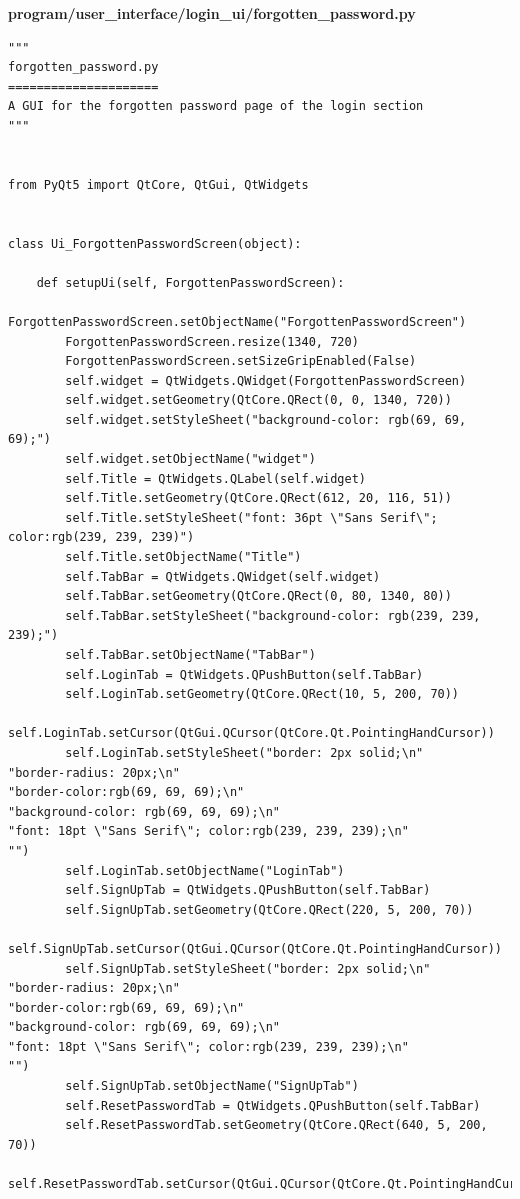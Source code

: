 \documentclass{article}
\begin{document}
\textbf{program/user\_interface/login\_ui/forgotten\_password.py}

\begin{lstlisting}
"""
forgotten_password.py
=====================
A GUI for the forgotten password page of the login section
"""


from PyQt5 import QtCore, QtGui, QtWidgets


class Ui_ForgottenPasswordScreen(object):

    def setupUi(self, ForgottenPasswordScreen):
        ForgottenPasswordScreen.setObjectName("ForgottenPasswordScreen")
        ForgottenPasswordScreen.resize(1340, 720)
        ForgottenPasswordScreen.setSizeGripEnabled(False)
        self.widget = QtWidgets.QWidget(ForgottenPasswordScreen)
        self.widget.setGeometry(QtCore.QRect(0, 0, 1340, 720))
        self.widget.setStyleSheet("background-color: rgb(69, 69, 69);")
        self.widget.setObjectName("widget")
        self.Title = QtWidgets.QLabel(self.widget)
        self.Title.setGeometry(QtCore.QRect(612, 20, 116, 51))
        self.Title.setStyleSheet("font: 36pt \"Sans Serif\"; color:rgb(239, 239, 239)")
        self.Title.setObjectName("Title")
        self.TabBar = QtWidgets.QWidget(self.widget)
        self.TabBar.setGeometry(QtCore.QRect(0, 80, 1340, 80))
        self.TabBar.setStyleSheet("background-color: rgb(239, 239, 239);")
        self.TabBar.setObjectName("TabBar")
        self.LoginTab = QtWidgets.QPushButton(self.TabBar)
        self.LoginTab.setGeometry(QtCore.QRect(10, 5, 200, 70))
        self.LoginTab.setCursor(QtGui.QCursor(QtCore.Qt.PointingHandCursor))
        self.LoginTab.setStyleSheet("border: 2px solid;\n"
"border-radius: 20px;\n"
"border-color:rgb(69, 69, 69);\n"
"background-color: rgb(69, 69, 69);\n"
"font: 18pt \"Sans Serif\"; color:rgb(239, 239, 239);\n"
"")
        self.LoginTab.setObjectName("LoginTab")
        self.SignUpTab = QtWidgets.QPushButton(self.TabBar)
        self.SignUpTab.setGeometry(QtCore.QRect(220, 5, 200, 70))
        self.SignUpTab.setCursor(QtGui.QCursor(QtCore.Qt.PointingHandCursor))
        self.SignUpTab.setStyleSheet("border: 2px solid;\n"
"border-radius: 20px;\n"
"border-color:rgb(69, 69, 69);\n"
"background-color: rgb(69, 69, 69);\n"
"font: 18pt \"Sans Serif\"; color:rgb(239, 239, 239);\n"
"")
        self.SignUpTab.setObjectName("SignUpTab")
        self.ResetPasswordTab = QtWidgets.QPushButton(self.TabBar)
        self.ResetPasswordTab.setGeometry(QtCore.QRect(640, 5, 200, 70))
        self.ResetPasswordTab.setCursor(QtGui.QCursor(QtCore.Qt.PointingHandCursor))

\end{lstlisting}
\end{document}
